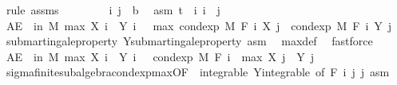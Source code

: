 \begin{isabellebody}
\ {\isacharparenleft}{\kern0pt}rule\ assms{\isacharparenright}{\kern0pt}\isanewline
\ \ \isacommand{{\isacharbraceleft}{\kern0pt}}\isamarkupfalse%
\isanewline
\ \ \ \ \isamarkupfalse%
\ i\ j\ {\isacharcolon}{\kern0pt}{\isacharcolon}{\kern0pt}\ {\isacharprime}{\kern0pt}b\ \isamarkupfalse%
\ asm{\isacharcolon}{\kern0pt}\ {\isachardoublequoteopen}t\ {\isasymle}\ i{\isachardoublequoteclose}\ {\isachardoublequoteopen}i\ {\isasymle}\ j{\isachardoublequoteclose}\isanewline
\ \ \ \ \isamarkupfalse%
\ {\isachardoublequoteopen}AE\ {\isasymxi}\ in\ M{\isachardot}{\kern0pt}\ max\ {\isacharparenleft}{\kern0pt}X\ i\ {\isasymxi}{\isacharparenright}{\kern0pt}\ {\isacharparenleft}{\kern0pt}Y\ i\ {\isasymxi}{\isacharparenright}{\kern0pt}\ {\isasymle}\ max\ {\isacharparenleft}{\kern0pt}cond{\isacharunderscore}{\kern0pt}exp\ M\ {\isacharparenleft}{\kern0pt}F\ i{\isacharparenright}{\kern0pt}\ {\isacharparenleft}{\kern0pt}X\ j{\isacharparenright}{\kern0pt}\ {\isasymxi}{\isacharparenright}{\kern0pt}\ {\isacharparenleft}{\kern0pt}cond{\isacharunderscore}{\kern0pt}exp\ M\ {\isacharparenleft}{\kern0pt}F\ i{\isacharparenright}{\kern0pt}\ {\isacharparenleft}{\kern0pt}Y\ j{\isacharparenright}{\kern0pt}\ {\isasymxi}{\isacharparenright}{\kern0pt}{\isachardoublequoteclose}\ \isamarkupfalse%
\ submartingale{\isacharunderscore}{\kern0pt}property\ Y{\isachardot}{\kern0pt}submartingale{\isacharunderscore}{\kern0pt}property\ asm\ \isamarkupfalse%
\ max{\isacharunderscore}{\kern0pt}def\ \isamarkupfalse%
\ fastforce\isanewline
\ \ \ \ \isamarkupfalse%
\ {\isachardoublequoteopen}AE\ {\isasymxi}\ in\ M{\isachardot}{\kern0pt}\ max\ {\isacharparenleft}{\kern0pt}X\ i\ {\isasymxi}{\isacharparenright}{\kern0pt}\ {\isacharparenleft}{\kern0pt}Y\ i\ {\isasymxi}{\isacharparenright}{\kern0pt}\ {\isasymle}\ cond{\isacharunderscore}{\kern0pt}exp\ M\ {\isacharparenleft}{\kern0pt}F\ i{\isacharparenright}{\kern0pt}\ {\isacharparenleft}{\kern0pt}{\isasymlambda}{\isasymxi}{\isachardot}{\kern0pt}\ max\ {\isacharparenleft}{\kern0pt}X\ j\ {\isasymxi}{\isacharparenright}{\kern0pt}\ {\isacharparenleft}{\kern0pt}Y\ j\ {\isasymxi}{\isacharparenright}{\kern0pt}{\isacharparenright}{\kern0pt}\ {\isasymxi}{\isachardoublequoteclose}\ \isamarkupfalse%
\ sigma{\isacharunderscore}{\kern0pt}finite{\isacharunderscore}{\kern0pt}subalgebra{\isachardot}{\kern0pt}cond{\isacharunderscore}{\kern0pt}exp{\isacharunderscore}{\kern0pt}max{\isacharbrackleft}{\kern0pt}OF\ {\isacharunderscore}{\kern0pt}\ integrable\ Y{\isachardot}{\kern0pt}integrable{\isacharcomma}{\kern0pt}\ of\ {\isachardoublequoteopen}F\ i{\isachardoublequoteclose}\ j\ j{\isacharbrackright}{\kern0pt}\ asm\ \isamarkupfalse%

\end{isabellebody}
